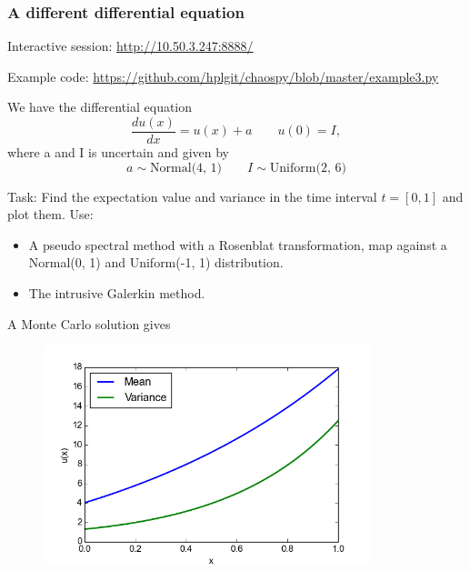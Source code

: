 \documentclass{beamer}
\begin{document}
\begin{frame}
\frametitle{A different differential equation}
   \begin{alert}{Interactive session:}
\href{http://10.50.3.247:8888/}{http://10.50.3.247:8888/}
  \end{alert}
  
   \begin{alert}{Example code:}
\href{https://github.com/hplgit/chaospy/blob/master/example3.py}{https://github.com/hplgit/chaospy/blob/master/example3.py}\newline
  \end{alert}  
  
We have the differential equation 
\[\frac{d u(x)}{dx} = u(x) + a \qquad u(0) = I,\]
where a and I is uncertain and given by
\[a\sim \text{Normal(4, 1)}\qquad I\sim \text{Uniform(2, 6)}\]
\begin{alert}{Task:}
Find the expectation value and variance in the time interval $t=[0,1]$  and plot them. Use:
\begin{itemize}
 \item A pseudo spectral method with a Rosenblat transformation, map against a Normal(0, 1) and Uniform(-1, 1) distribution.
 \item The intrusive Galerkin method.
\end{itemize}

\end{alert}
\end{frame}

\begin{frame}{A Monte Carlo solution gives}
 \begin{figure}
  \includegraphics[width=0.85\textwidth]{solution8mc.png}
 \end{figure}

\end{frame}
\end{document}

